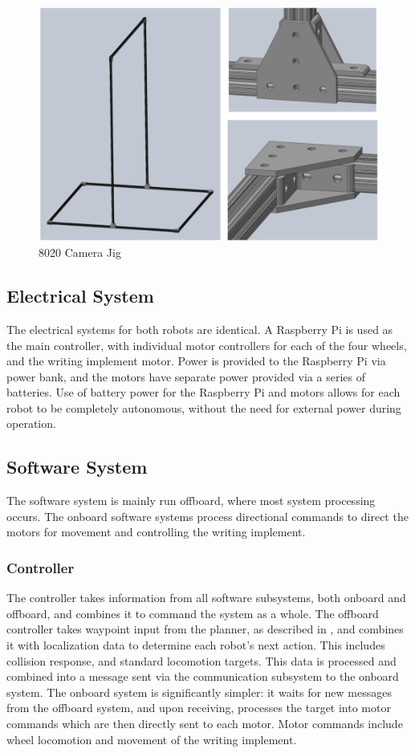 \begin{figure}
\centering
\includegraphics[width=0.98\columnwidth]{figs/infrastructure.png}
\caption{8020 Camera Jig}
\label{fig:so5}
\end{figure}

\subsection{Electrical System}
\label{sec:electrical}
The electrical systems for both robots are identical. A Raspberry Pi is used as the main controller, with individual motor controllers for each of the four wheels, and the writing implement motor. Power is provided to the Raspberry Pi via power bank, and the motors have separate power provided via a series of batteries. Use of battery power for the Raspberry Pi and motors allows for each robot to be completely autonomous, without the need for external power during operation.

\subsection{Software System}
\label{sec:software}
The software system is mainly run offboard, where most system processing occurs. The onboard software systems process directional commands to direct the motors for movement and controlling the writing implement.

\subsubsection{Controller}
\label{sec:sw_controller}
The controller takes information from all software subsystems, both onboard and offboard, and combines it to command the system as a whole. The offboard controller takes waypoint input from the planner, as described in , and combines it with localization data to determine each robot's next action. This includes collision response, and standard locomotion targets. This data is processed and combined into a message sent via the communication subsystem to the onboard system. The onboard system is significantly simpler: it waits for new messages from the offboard system, and upon receiving, processes the target into motor commands which are then directly sent to each motor. Motor commands include wheel locomotion and movement of the writing implement.

